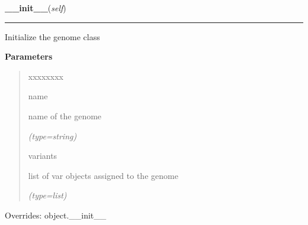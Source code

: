 \hspace{.8\funcindent}\begin{boxedminipage}{\funcwidth}

    \raggedright \textbf{\_\_init\_\_}(\textit{self})

    \vspace{-1.5ex}

    \rule{\textwidth}{0.5\fboxrule}
\setlength{\parskip}{2ex}
    Initialize the genome class

\setlength{\parskip}{1ex}
      \textbf{Parameters}
      \vspace{-1ex}

      \begin{quote}
        \begin{Ventry}{xxxxxxxx}

          \item[name]

          name of the genome

            {\it (type=string)}

          \item[variants]

          list of var objects assigned to the genome

            {\it (type=list)}

        \end{Ventry}

      \end{quote}

      Overrides: object.\_\_init\_\_

    \end{boxedminipage}

    \label{script-FixedVar:genome:setName}

    \vspace{0.5ex}

